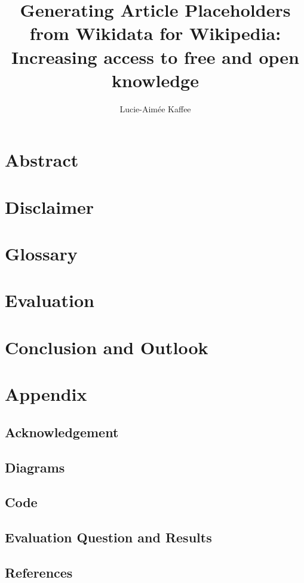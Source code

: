 \documentclass[12pt]{report}
\title{Generating Article Placeholders from Wikidata for Wikipedia:\\Increasing access to free and open knowledge}
\author{Lucie-Aim\'{e}e Kaffee}
\date{}
\begin{document}
\maketitle
\newpage


\section*{Abstract}
\section*{Disclaimer}
\section*{Glossary}
\newpage

\tableofcontents




\newpage

\newpage

\section{Evaluation}
\section{Conclusion and Outlook}
\section{Appendix}
	\subsection{Acknowledgement}
	\subsection{Diagrams}
	\subsection{Code}
	\subsection{Evaluation Question and Results}
	\subsection{References}
\end{document}
